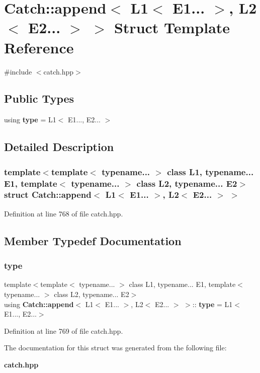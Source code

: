 \section{Catch\+::append$<$ L1$<$ E1... $>$, L2$<$ E2... $>$ $>$ Struct Template Reference}
\label{struct_catch_1_1append_3_01_l1_3_01_e1_8_8_8_01_4_00_01_l2_3_01_e2_8_8_8_01_4_01_4}


{\ttfamily \#include $<$catch.\+hpp$>$}

\subsection*{Public Types}
\begin{DoxyCompactItemize}
\item 
using \textbf{ type} = L1$<$ E1..., E2... $>$
\end{DoxyCompactItemize}


\subsection{Detailed Description}
\subsubsection*{template$<$template$<$ typename... $>$ class L1, typename... E1, template$<$ typename... $>$ class L2, typename... E2$>$\newline
struct Catch\+::append$<$ L1$<$ E1... $>$, L2$<$ E2... $>$ $>$}



Definition at line 768 of file catch.\+hpp.



\subsection{Member Typedef Documentation}
\mbox{\label{struct_catch_1_1append_3_01_l1_3_01_e1_8_8_8_01_4_00_01_l2_3_01_e2_8_8_8_01_4_01_4_a1cfbd4f828534748c95543b4eac962cd}} 
\subsubsection{type}
{\footnotesize\ttfamily template$<$template$<$ typename... $>$ class L1, typename... E1, template$<$ typename... $>$ class L2, typename... E2$>$ \\
using \textbf{ Catch\+::append}$<$ L1$<$ E1... $>$, L2$<$ E2... $>$ $>$\+::\textbf{ type} =  L1$<$E1..., E2...$>$}



Definition at line 769 of file catch.\+hpp.



The documentation for this struct was generated from the following file\+:\begin{DoxyCompactItemize}
\item 
\textbf{ catch.\+hpp}\end{DoxyCompactItemize}
